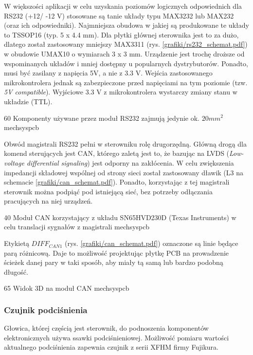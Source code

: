 W większości aplikacji w celu uzyskania poziomów logicznych odpowiednich dla RS232 (+12/ -12 V) stosowane są tanie układy typu MAX3232 lub MAX232 (oraz ich odpowiedniki). Najmniejsza obudowa w jakiej są produkowane te układy to TSSOP16 (typ. 5 x 4.4 mm). Dla płytki głównej sterownika jest to za dużo, dlatego został zastosowany mniejszy   MAX3311 (rys. \ref{grafiki/rs232_schemat.pdf}) w obudowie UMAX10 o wymiarach 3 x 3 mm. Urządzenie jest trochę droższe od wspominanych układów i mniej dostępny \linebreak u popularnych dystrybutorów. Ponadto, musi być zasilany z napięcia 5V, a nie z 3.3 V. Wejścia zastosowanego mikrokontrolera jednak są zabezpieczone przed napięciami na tym poziomie (tzw. {\it 5V compatible}). Wyjściowe 3.3 V z mikrokontrolera wystarczy zmiany stanu w układzie (TTL).

	{60}
	{Komponenty używane przez moduł RS232 zajmują jedynie ok. $ 20 mm^2 $}
	{mechsyspcb}

Obwód magistrali RS232 pełni w sterowniku rolę drugorzędną. Główną drogą dla komend sterujących jest CAN, którego zaletą jest to, że bazując na LVDS ({\it Low-voltage differential signaling}) jest odporny na zakłócenia. W celu zwiększenia impedancji składowej wspólnej od strony sieci został zastosowany dławik (L3 na schemacie \ref{grafiki/can_schemat.pdf}). Ponadto, korzystając z tej magistrali sterownik można podpiąć pod istniejącą sieć, bez potrzeby odłączania pracujących na niej urządzeń.

	{40}
	{Moduł CAN korzystający z układu SN65HVD230D (Texas Instruments) w celu translacji sygnałów z magistrali}
	{mechsyspcb}
	
Etykietą $ DIFF_{CAN1} $ (rys. \ref{grafiki/can_schemat.pdf}) oznaczone są linie będące parą różnicową. Daje to możliwość projektując płytkę PCB na prowadzenie ścieżek danej pary w taki sposób, aby miały tą samą lub bardzo podobną długość.

	{65}
	{Widok 3D na moduł CAN}
	{mechsyspcb}
	
\subsubsection{Czujnik podciśnienia}
\label{sss:pressure_sensor}

Głowica, której częścią jest sterownik, do podnoszenia komponentów elektronicznych używa ssawki podciśnieniowej. Możliwość pomiaru wartości aktualnego podciśnienia zapewnia czujnik z serii XFHM firmy Fujikura. 

